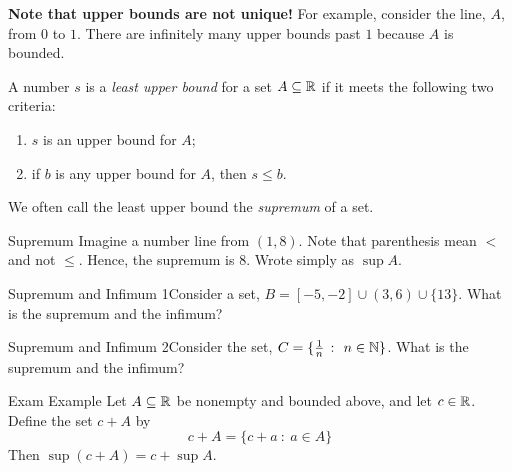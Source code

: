 \textbf{Note that upper bounds are not unique!} For example, consider the line, \(A\), from \(0\) to \(1\). There are infinitely many upper bounds past \(1\) because \(A\) is bounded.

\begin{definition}
    A number \(s\) is a \textit{least upper bound} for a set \(A \subseteq \mathbb{R}\) if it meets the following two criteria:
    \begin{enumerate}[label=(\roman*)]
        \item \(s\) is an upper bound for \(A\);
        \item if \(b\) is any upper bound for \(A\), then \(s \leq b\).
    \end{enumerate}
\end{definition}

We often call the least upper bound the \textit{supremum} of a set.

\begin{example}
    {Supremum} Imagine a number line from \((1,8)\). Note that parenthesis mean \(<\) and not \(\leq\). Hence, the supremum is \(8\). Wrote simply as \(\sup A\).
\end{example}




\begin{example}
    {Supremum and Infimum 1}Consider a set, \(B = [-5,-2] \cup (3,6) \cup \{13\}\). What is the supremum and the infimum?
\end{example}


\begin{example}
    {Supremum and Infimum 2}Consider the set, \(C = \{\frac{1}{n} \ \colon \ n \in \mathbb{N}\}\). What is the supremum and the infimum?
\end{example}


\begin{example}
    {Exam Example} Let \(A \subseteq \mathbb{R}\) be nonempty and bounded above, and let \(c \in \mathbb{R}\). Define the set \(c + A\) by \[c + A = \{c+a \ \colon \ a \in A\}\] Then \(\sup(c + A) = c + \sup A\).
\end{example}


